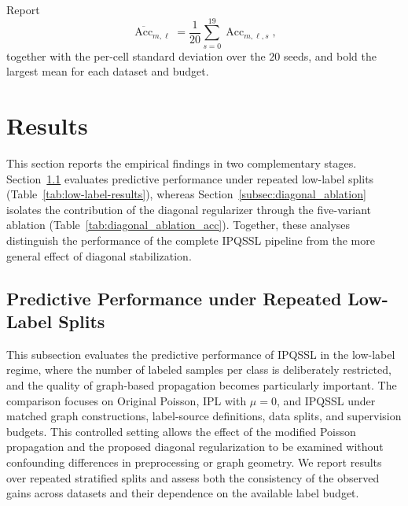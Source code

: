 \documentclass[11pt,a4paper]{article}
\begin{document}
\begin{algorithm}[H]
\begin{algorithmic}[1]
        \EndFor
    \EndFor

\EndFor

\State Report
\[
\overline{\operatorname{Acc}}_{m,\ell}
=
\frac{1}{20}
\sum_{s=0}^{19}
\operatorname{Acc}_{m,\ell,s},
\]
together with the per-cell standard deviation over the \(20\) seeds,
and bold the largest mean for each dataset and budget.

\end{algorithmic}
\end{algorithm}




\section{Results}
\label{sec:results}

This section reports the empirical findings in two complementary stages.
Section~\ref{subsec:low-label-performance} evaluates predictive performance
under repeated low-label splits (Table~\ref{tab:low-label-results}), whereas
Section~\ref{subsec:diagonal_ablation} isolates the contribution of the
diagonal regularizer through the five-variant ablation
(Table~\ref{tab:diagonal_ablation_acc}). Together, these analyses distinguish
the performance of the complete \textsc{IPQSSL} pipeline from the more general
effect of diagonal stabilization.

\subsection{Predictive Performance under Repeated Low-Label Splits}
\label{subsec:low-label-performance}

This subsection evaluates the predictive performance of \textsc{IPQSSL} in the low-label regime, where the number of labeled samples per class is deliberately restricted, and the quality of graph-based propagation becomes particularly important. The comparison focuses on Original Poisson, IPL with \(\mu=0\), and \textsc{IPQSSL} under matched graph constructions, label-source definitions, data splits, and supervision budgets. This controlled setting allows the effect of the modified Poisson propagation and the proposed diagonal regularization to be examined without confounding differences in preprocessing or graph geometry. We report results over repeated stratified splits and assess both the consistency
of the observed gains across datasets and their dependence on the available
label budget.
\end{document}
